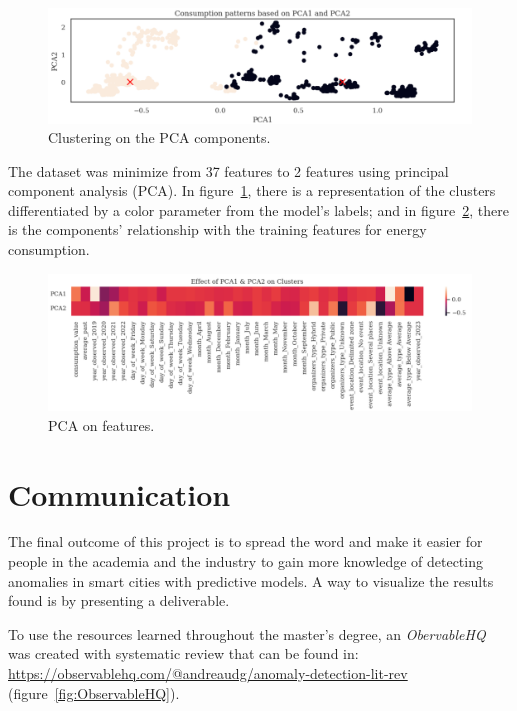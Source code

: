 \documentclass[a4paper,12pt,twoside]{ThesisStyle}
\begin{document}
\begin{figure}[hbt]
\centering
\includegraphics[width=13 cm]{imatges/patterns_pca_kmeans.png}
\caption{\label{fig:patterns_pca_kmeans} Clustering on the PCA components.}
\end{figure}

The dataset was minimize from 37 features to 2 features using principal component analysis (PCA). In figure~\ref{fig:patterns_pca_kmeans}, there is a representation of the clusters differentiated by a color parameter from the model's labels; and in figure~\ref{fig:effect_pca_kmeans}, there is the components' relationship with the training features for energy consumption.

\begin{figure}[hbt]
\centering
\includegraphics[width=13 cm]{imatges/effect_pca_kmeans.png}
\caption{\label{fig:effect_pca_kmeans} PCA on features.}
\end{figure}

\section{Communication}

The final outcome of this project is to spread the word and make it easier for people in the academia and the industry to gain more knowledge of detecting anomalies in smart cities with predictive models. A way to visualize the results found is by presenting a deliverable.

To use the resources learned throughout the master's degree, an \textit{ObervableHQ} was created with systematic review that can be found in: \url{https://observablehq.com/@andreaudg/anomaly-detection-lit-rev} (figure~\ref{fig:ObservableHQ}).
\end{document}

